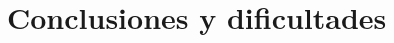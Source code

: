 \pagestyle{fancy}
\fancyhead[l]{\autorUO}
\fancyfoot[l]{\asignaturaAbbr}
\fancyfoot[r]{\fecha}

\section{Conclusiones y dificultades} \label{sec:4}